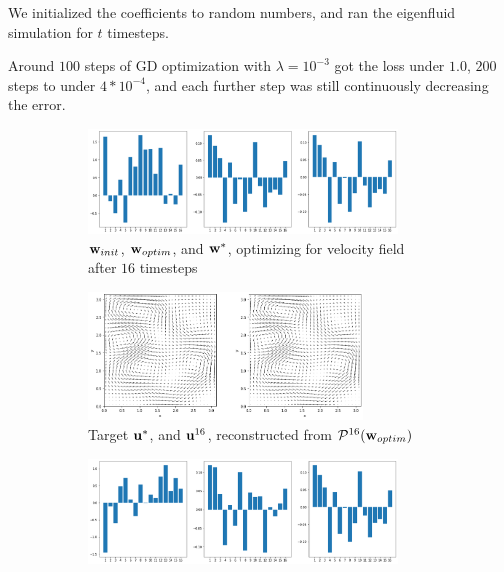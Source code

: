 We initialized the coefficients to random numbers, and ran the eigenfluid
simulation for $t$ timesteps.

Around $100$ steps of \ac{GD} optimization with $\lambda=10^{-3}$ got the loss
under $1.0$, $200$ steps to under $4*10^{-4}$, and each further step was still
continuously decreasing the error. 

\begin{figure}
  \label{fig:finding-initial-velocities}
  \centering
  \begin{subfigure}{\textwidth}
    \centering
    \includegraphics[width=0.9\textwidth]{figures/finding-initial-velocities/t_16_coefficients.png}
    \caption{$\vb{w}_{init}$, $\vb{w}_{optim}$, and
    $\vb{w}^*$, optimizing for velocity field after $16$ timesteps}
  \end{subfigure}\par\medskip
  \begin{subfigure}{\textwidth}
    \centering
    \includegraphics[width=0.8\textwidth]{figures/finding-initial-velocities/t_16_velocities.png}
    \caption{Target $\vb{u}^*$, and $\vb{u}^{16}$, reconstructed from
      $\mathcal{P}^{16}(\vb{w}_{optim})$\\}
  \end{subfigure}\par\medskip
  \begin{subfigure}{\textwidth}
    \centering
    \includegraphics[width=0.9\textwidth]{figures/finding-initial-velocities/t_100_coefficients.png}

\end{subfigure}
\end{figure}
